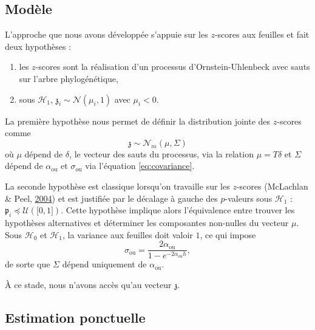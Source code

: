 \documentclass[12pt,a4paper]{reedthesis}
\providecommand{\tightlist}{%
  \setlength{\itemsep}{0pt}\setlength{\parskip}{0pt}}
\newcommand \unif [1] {\mathcal{U}\left({#1}\right)}
\newcommand \normal [2] {\mathcal{N}\left({#1},{#2}\right)}
\newcommand \ou [1]{{#1}_{\text{ou}}}
\newcommand \pv {\mathfrak{p}}
\newcommand \zs {\mathfrak{z}}
\newcommand \shifts {\delta}
\theoremstyle{definition}
\theoremstyle{definition}
\theoremstyle{definition}
\theoremstyle{remark}
\begin{document}
\hypertarget{moduxe8le}{%
\subsection{Modèle}\label{moduxe8le}}

L'approche que nous avons développée s'appuie sur les \(z\)-scores aux feuilles et fait deux hypothèses :
\begin{enumerate}
\def\labelenumi{\arabic{enumi}.}
\tightlist
\item
  les \(z\)-scores sont la réalisation d'un processus d'Ornstein-Uhlenbeck avec sauts sur l'arbre phylogénétique,
\item
  sous \(\mathcal{H}_1\), \(\zs_i \sim \normal{\mu_i}{1}\) avec \(\mu_i < 0\).
\end{enumerate}
La première hypothèse nous permet de définir la distribution jointe des \(z\)-scores comme
\begin{equation*}
\zs \sim \mathcal{N}_{m}\left(\mu,\Sigma\right)
\end{equation*}
où \(\mu\) dépend de \(\shifts\), le vecteur des sauts du processus, via la relation \(\mu = T\delta\) et \(\Sigma\) dépend de \(\ou{\alpha}\) et \(\ou{\sigma}\) via l'équation \eqref{eq:covariance}.

La seconde hypothèse est classique lorsqu'on travaille sur les \(z\)-scores (McLachlan \& Peel, \protect\hyperlink{ref-mclachlan2004finite}{2004}) et est justifiée par le décalage à gauche des \(p\)-valeurs sous \(\mathcal{H}_1\) : \(\pv_i \preccurlyeq \unif{\mathopen[0, 1\mathclose]}\). Cette hypothèse implique alors l'équivalence entre trouver les hypothèses alternatives et déterminer les composantes non-nulles du vecteur \(\mu\). Sous \(\mathcal{H}_0\) et \(\mathcal{H}_1\), la variance aux feuilles doit valoir \(1\), ce qui impose
\begin{equation*}
\ou{\sigma}=\frac{2\ou{\alpha}}{1 - e^{-2\ou{\alpha}h}},
\end{equation*}
de sorte que \(\Sigma\) dépend uniquement de \(\ou{\alpha}\).

À ce stade, nous n'avons accès qu'au vecteur \(\zs\).

\hypertarget{estimation-ponctuelle}{%
\subsection{Estimation ponctuelle}\label{estimation-ponctuelle}}
\end{document}
